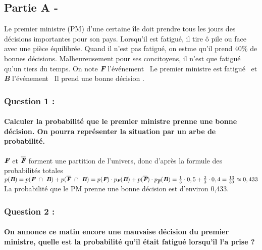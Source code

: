 \documentclass[a4paper, 12pt]{article}
\begin{document}
\subsection*{Partie A - }
Le premier ministre (PM) d'une certaine île doit prendre tous les jours des décisions importantes pour son pays. Lorsqu'il est fatigué, il tire ô pile ou face avec une pièce équilibrée.
Quand il n'est pas fatigué, on estme qu'il prend 40\% de bonnes décisions. Malheureusement pour ses concitoyens, il n'est que fatigué qu'un tiers du temps. On note \emph{\textbf{F}} l'événement 
\guillemotleft \ Le premier ministre est fatigué \guillemotright \ et \emph{\textbf{B}} l'événement \guillemotleft \ Il prend une bonne décision \guillemotright.

{}
\subsubsection*{Question 1 :}
\paragraph*{Calculer la probabilité que le premier ministre prenne une bonne décision. On pourra représenter la situation par un arbe de probabilité.\\[5mm]}

$\emph{\textbf{F}}$ et $\overline{\emph{\textbf{F}}}$ forment une partition de l'univers, donc d'après la formule des probabilités totales 
$p(\emph{\textbf{B}}) = p(\emph{\textbf{F}}\  \cap \ \emph{\textbf{B}}) + p(\overline{\emph{\textbf{F}}}\ \cap \ \emph{\textbf{B}}) 
= p(\emph{\textbf{F}}) \cdot p_{\emph{\textbf{F}}}(\emph{\textbf{B}}) + p(\overline{\emph{\textbf{F}}}) \cdot p_{\overline{\emph{\textbf{F}}}}(\emph{\textbf{B}}) 
= \frac{1}{3} \cdot 0,5 + \frac{2}{3} \cdot 0,4 = \frac{13}{30} \approx 0,433$
\\
La probabilité que le PM prenne une bonne décision est d'environ 0,433.

{}
\subsubsection*{Question 2 :}
\paragraph*{On annonce ce matin encore une mauvaise décision du premier ministre, quelle est la probabilité qu'il était fatigué lorsqu'il l'a prise ?\\[5mm]}
\end{document}
